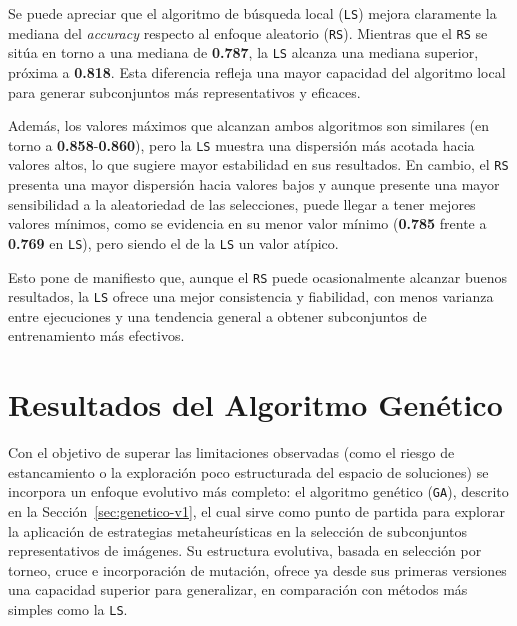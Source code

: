 Se puede apreciar que el algoritmo de búsqueda local (\texttt{LS}) mejora claramente la mediana del \textit{accuracy} respecto al enfoque aleatorio (\texttt{RS}).
Mientras que el \texttt{RS} se sitúa en torno a una mediana de \textbf{0.787}, la \texttt{LS} alcanza una mediana superior, próxima a \textbf{0.818}.
Esta diferencia refleja una mayor capacidad del algoritmo local para generar subconjuntos más representativos y eficaces.

Además, los valores máximos que alcanzan ambos algoritmos son similares (en torno a \textbf{0.858}-\textbf{0.860}),
pero la \texttt{LS} muestra una dispersión más acotada hacia valores altos, lo que sugiere mayor estabilidad en sus resultados.
En cambio, el \texttt{RS} presenta una mayor dispersión hacia valores bajos y aunque presente una mayor sensibilidad a la aleatoriedad de las selecciones,
puede llegar a tener mejores valores mínimos, como se evidencia en su menor valor mínimo (\textbf{0.785} frente a \textbf{0.769} en \texttt{LS}),
pero siendo el de la \texttt{LS} un valor atípico.

Esto pone de manifiesto que, aunque el \texttt{RS} puede ocasionalmente alcanzar buenos resultados,
la \texttt{LS} ofrece una mejor consistencia y fiabilidad, con menos varianza entre ejecuciones y una tendencia general a obtener subconjuntos de entrenamiento más efectivos.


\section{Resultados del Algoritmo Genético}\label{sec:resultados-algoritmo-genetico}
Con el objetivo de superar las limitaciones observadas (como el riesgo de estancamiento o la exploración poco estructurada del espacio de soluciones)
se incorpora un enfoque evolutivo más completo: el algoritmo genético (\texttt{GA}), descrito en la Sección~\ref{sec:genetico-v1}, el cual sirve como punto de partida para explorar la
aplicación de estrategias metaheurísticas en la selección de subconjuntos representativos de imágenes.
Su estructura evolutiva, basada en selección por torneo, cruce e incorporación de mutación,
ofrece ya desde sus primeras versiones una capacidad superior para generalizar, en comparación con métodos más simples como la \texttt{LS}.

